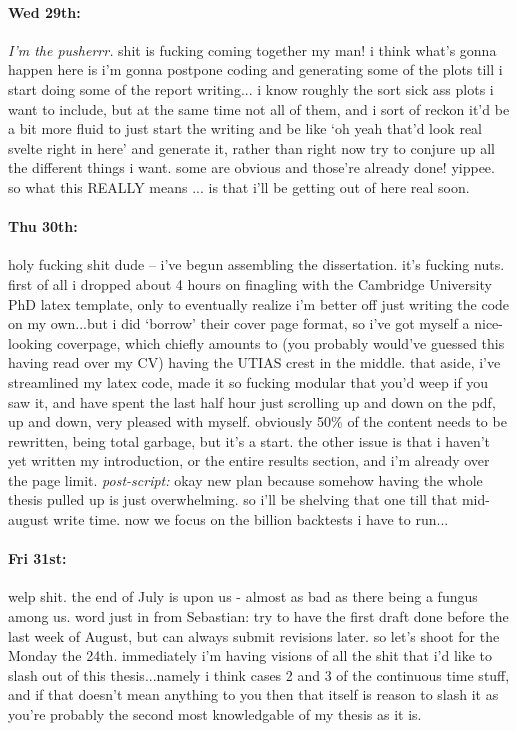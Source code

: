 \documentclass[12pt]{article}
\begin{document}
\paragraph{Wed 29th:} \textit{I'm the pusherrr.} shit is fucking coming together my man! i think what's gonna happen here is i'm gonna postpone coding and generating some of the plots till i start doing some of the report writing... i know roughly the sort sick ass plots i want to include, but at the same time not all of them, and i sort of reckon it'd be a bit more fluid to just start the writing and be like `oh yeah that'd look real svelte right in here' and generate it, rather than right now try to conjure up all the different things i want. some are obvious and those're already done! yippee. so what this REALLY means ... is that i'll be getting out of here real soon.

\paragraph{Thu 30th:} holy fucking shit dude -- i've begun assembling the dissertation. it's fucking nuts. first of all i dropped about 4 hours on finagling with the Cambridge University PhD latex template, only to eventually realize i'm better off just writing the code on my own...but i did `borrow' their cover page format, so i've got myself a nice-looking coverpage, which chiefly amounts to (you probably would've guessed this having read over my CV) having the UTIAS crest in the middle. that aside, i've streamlined my latex code, made it so fucking modular that you'd weep if you saw it, and have spent the last half hour just scrolling up and down on the pdf, up and down, very pleased with myself. obviously 50\% of the content needs to be rewritten, being total garbage, but it's a start. the other issue is that i haven't yet written my introduction, or the entire results section, and i'm already over the page limit. \textit{post-script:} okay new plan because somehow having the whole thesis pulled up is just overwhelming. so i'll be shelving that one till that mid-august write time. now we focus on the billion backtests i have to run...

\paragraph{Fri 31st:} welp shit. the end of July is upon us - almost as bad as there being a fungus among us. word just in from Sebastian: try to have the first draft done before the last week of August, but can always submit revisions later. so let's shoot for the Monday the 24th. immediately i'm having visions of all the shit that i'd like to slash out of this thesis...namely i think cases 2 and 3 of the continuous time stuff, and if that doesn't mean anything to you then that itself is reason to slash it as you're probably the second most knowledgable of my thesis as it is.
\end{document}
